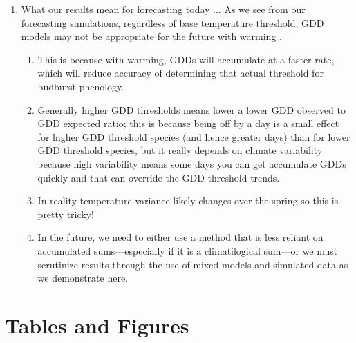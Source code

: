 \documentclass{article}\usepackage[]{graphicx}\usepackage[]{color}
\begin{document}
\begin{enumerate}
  \item What our results mean for forecasting today ... As we see from our forecasting simulations, regardless of base temperature threshold, GDD models may not be appropriate for the future with warming \citep{Man2010}. 
  \begin{enumerate} 
    \item This is because with warming, GDDs will accumulate at a faster rate, which will reduce accuracy of determining that actual threshold for budburst phenology. 
  \item Generally higher GDD thresholds means lower a lower GDD observed to GDD expected ratio; this is because being off by a day is a small effect for higher GDD threshold species (and hence greater days) than for lower GDD threshold species, but it really depends on climate variability because high variability means some days you can get accumulate GDDs quickly and that can override the GDD threshold trends. 
  \item In reality temperature variance likely changes over the spring so this is pretty tricky! 
  \item In the future, we need to either use a method that is less reliant on accumulated sums---especially if it is a climatilogical sum---or we must scrutinize results through the use of mixed models and simulated data as we demonstrate here.
  \end{enumerate}
\end{enumerate}





\section*{Tables and Figures}
\end{document}
